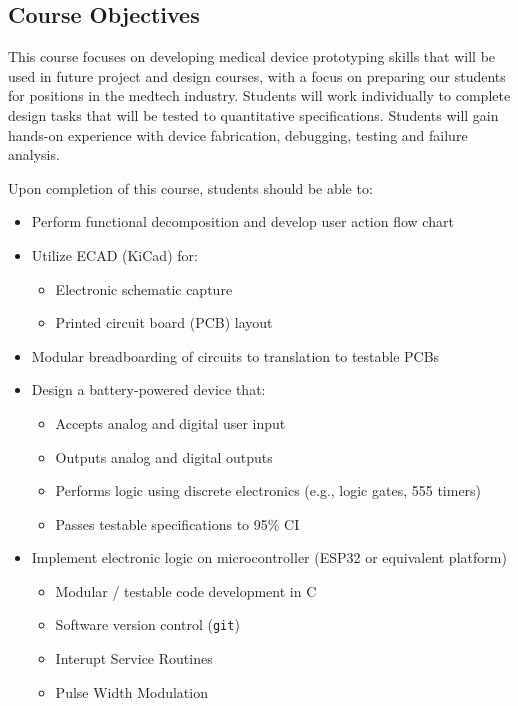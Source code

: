 \documentclass[10pt]{report}
\begin{document}
\subsection*{Course Objectives}
This course focuses on developing medical device prototyping skills that will be
used in future project and design courses, with a focus on preparing our
students for positions in the medtech industry.  Students will work individually
to complete design tasks that will be tested to quantitative specifications.
Students will gain hands-on experience with device fabrication, debugging,
testing and failure analysis.

Upon completion of this course, students should be able to:

\begin{itemize}
    \item Perform functional decomposition and develop user action flow chart
    \item Utilize ECAD (KiCad) for:
    \begin{itemize}
        \item Electronic schematic capture
        \item Printed circuit board (PCB) layout
    \end{itemize}
    \item Modular breadboarding of circuits to translation to testable PCBs
    \item Design a battery-powered device that:
    \begin{itemize}
        \item Accepts analog and digital user input
        \item Outputs analog and digital outputs
        \item Performs logic using discrete electronics (e.g., logic gates, 555 timers)
        \item Passes testable specifications to 95\% CI
    \end{itemize}
    \item Implement electronic logic on microcontroller (ESP32 or equivalent platform)
    \begin{itemize}
        \item Modular / testable code development in C
        \item Software version control (\texttt{git})
        \item Interupt Service Routines
        \item Pulse Width Modulation

\end{itemize}
\end{itemize}
\end{document}
